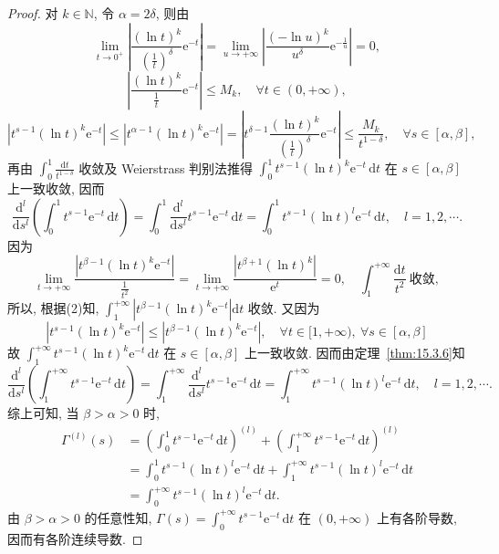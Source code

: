 \begin{proof}
对 $k\in\mathbb{N}$, 令 $\alpha=2\delta$, 则由
\[
  \lim_{t\to 0^{+}}\left|\frac{(\ln t)^{k}}{\left(\frac{1}{t}\right)^\delta}\mathrm{e}^{-t}\right|=\lim_{u\to+\infty}\left|\frac{(-\ln u)^{k}}{u^\delta}\mathrm{e}^{-\frac{1}{u}}\right|=0,
\]
\[
  \left|\frac{(\ln t)^{k}}{\frac{1}{t}}\mathrm{e}^{-t}\right|\leqslant M_{k},\quad\forall t\in(0,+\infty), %
\]
\[
  \left|t^{s-1}(\ln t)^{k}\mathrm{e}^{-t}\right|\leqslant\left|t^{\alpha-1}(\ln t)^{k}\mathrm{e}^{-t}\right|=\left|t^{\delta-1}\frac{(\ln t)^{k}}{\left(\frac{1}{t}\right)^{\delta}}\mathrm{e}^{-t}\right|\leqslant\frac{M_{k}}{t^{1-\delta}},\quad\forall s\in[\alpha,\beta],
\]
再由 $\displaystyle\int_{0}^{1}\frac{\mathrm{d}t}{t^{1-\delta}}$ 收敛及 Weierstrass 判别法推得 $\displaystyle\int_{0}^{1}t^{s-1}(\ln t)^{k}\mathrm{e}^{-t}\,\mathrm{d}t$ 在 $s\in[\alpha,\beta]$ 上一致收敛, 因而
\[
  \frac{\mathrm{d}^{l}}{\mathrm{d}s^{l}}\left(\int_{0}^{1}t^{s-1}\mathrm{e}^{-t}\,\mathrm{d}t\right)=\int_{0}^{1}\frac{\mathrm{d}^{l}}{\mathrm{d}s^{l}}t^{s-1}\mathrm{e}^{-t}\,\mathrm{d}t=\int_{0}^{1}t^{s-1}(\ln t)^{l}\mathrm{e}^{-t}\,\mathrm{d}t,\quad l=1,2,\cdots.
\]
因为
\[
  \lim_{t\to+\infty}\frac{\left|t^{\beta-1}(\ln t)^{k}\mathrm{e}^{-t}\right|}{\frac{1}{t^{2}}}=\lim_{t\to+\infty}\frac{\left|t^{\beta+1}(\ln t)^{k}\right|}{\mathrm{e}^{t}}=0,\quad\int_{1}^{+\infty}\frac{\mathrm{d}t}{t^{2}}\ \text{收敛},
\]
所以, 根据(2)知, $\displaystyle\int_{1}^{+\infty}\left|t^{\beta-1}(\ln t)^{k}\mathrm{e}^{-t}\right|\mathrm{d}t$ 收敛. 又因为
\[
  \left|t^{s-1}(\ln t)^{k}\mathrm{e}^{-t}\right|\leqslant\left|t^{\beta-1}(\ln t)^{k}\mathrm{e}^{-t}\right|,\quad\forall t\in[1,+\infty),\ \forall s\in[\alpha,\beta]
\]
故 $\displaystyle\int_{1}^{+\infty}t^{s-1}(\ln t)^{k}\mathrm{e}^{-t}\,\mathrm{d}t$ 在 $s\in[\alpha,\beta]$ 上一致收敛. 因而由定理~\ref{thm:15.3.6}知
\[
  \frac{\mathrm{d}^{l}}{\mathrm{d}s^{l}}\left(\int_{1}^{+\infty}t^{s-1}\mathrm{e}^{-t}\,\mathrm{d}t\right)=\int_{1}^{+\infty}\frac{\mathrm{d}^{l}}{\mathrm{d}s^{l}}t^{s-1}\mathrm{e}^{-t}\,\mathrm{d}t=\int_{1}^{+\infty}t^{s-1}(\ln t)^{l}\mathrm{e}^{-t}\,\mathrm{d}t,\quad l=1,2,\cdots.
\]
综上可知, 当 $\beta>\alpha>0$ 时,
\[
  \begin{aligned}
    \Gamma^{(l)}(s)&=\left(\int_{0}^{1}t^{s-1}\mathrm{e}^{-t}\,\mathrm{d}t\right)^{(l)}+\left(\int_{1}^{+\infty}t^{s-1}\mathrm{e}^{-t}\,\mathrm{d}t\right)^{(l)}\\
    &=\int_{0}^{1}t^{s-1}(\ln t)^{l}\mathrm{e}^{-t}\,\mathrm{d}t+\int_{1}^{+\infty}t^{s-1}(\ln t)^{l}\mathrm{e}^{-t}\,\mathrm{d}t\\
    &=\int_{0}^{+\infty}t^{s-1}(\ln t)^{l}\mathrm{e}^{-t}\,\mathrm{d}t.
  \end{aligned}
\]
由 $\beta>\alpha>0$ 的任意性知, $\displaystyle\Gamma(s)=\int_{0}^{+\infty}t^{s-1}\mathrm{e}^{-t}\,\mathrm{d}t$ 在 $(0,+\infty)$ 上有各阶导数, 因而有各阶连续导数.
\end{proof}

